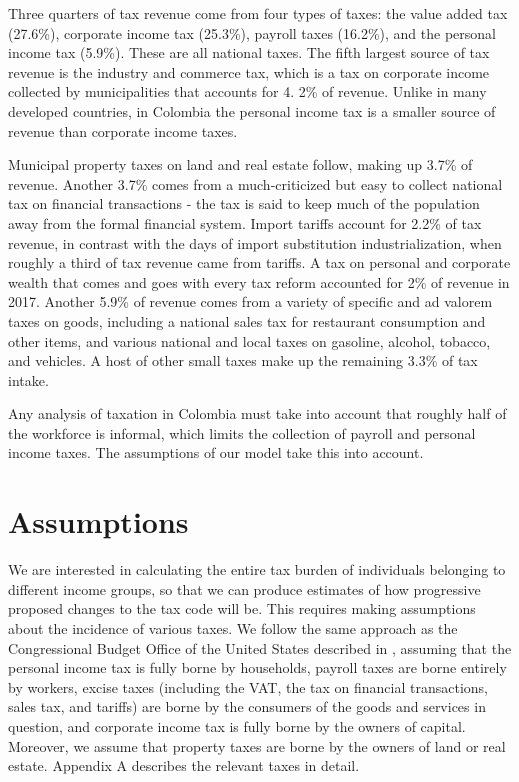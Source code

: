 \documentclass[12pt]{article}
\begin{document}
Three quarters of tax revenue come from four types of taxes: the value added tax (27.6\%), corporate income tax (25.3\%), payroll taxes (16.2\%), and the personal income tax (5.9\%).
These are all national taxes.
The fifth largest source of tax revenue is the industry and commerce tax, which is a tax on corporate income collected by municipalities that accounts for 4.
2\% of revenue.
Unlike in many developed countries, in Colombia the personal income tax is a smaller source of revenue than corporate income taxes.

Municipal property taxes on land and real estate follow, making up 3.7\% of revenue.
Another 3.7\% comes from a much-criticized but easy to collect national tax on financial transactions - the tax is said to keep much of the population away from the formal financial system.
Import tariffs account for 2.2\% of tax revenue, in contrast with the days of import substitution industrialization, when roughly a third of tax revenue came from tariffs.
A tax on personal and corporate wealth that comes and goes with every tax reform accounted for 2\% of revenue in 2017.
Another 5.9\% of revenue comes from a variety of specific and ad valorem taxes on goods, including a national sales tax for restaurant consumption and other items, and various national and local taxes on gasoline, alcohol, tobacco, and vehicles.
A host of other small taxes make up the remaining 3.3\% of tax intake.

Any analysis of taxation in Colombia must take into account that roughly half of the workforce is informal, which limits the collection of payroll and personal income taxes.
The assumptions of our model take this into account.

\section{Assumptions}

We are interested in calculating the entire tax burden of individuals belonging to different income groups,  so that we can produce estimates of how progressive proposed changes to the tax code will be.
This requires making assumptions about the incidence of various taxes.
We follow the same approach as the Congressional Budget Office of the United States described in \citet{salanie}, assuming that the personal income tax is fully borne by households, payroll taxes are borne entirely by workers, excise taxes (including the VAT, the tax on financial transactions, sales tax, and tariffs) are borne by the consumers of the goods and services in question, and corporate income tax is fully borne by the owners of capital.
Moreover, we assume that property taxes are borne by the owners of land or real estate.
Appendix A describes the relevant taxes in detail.
\end{document}
